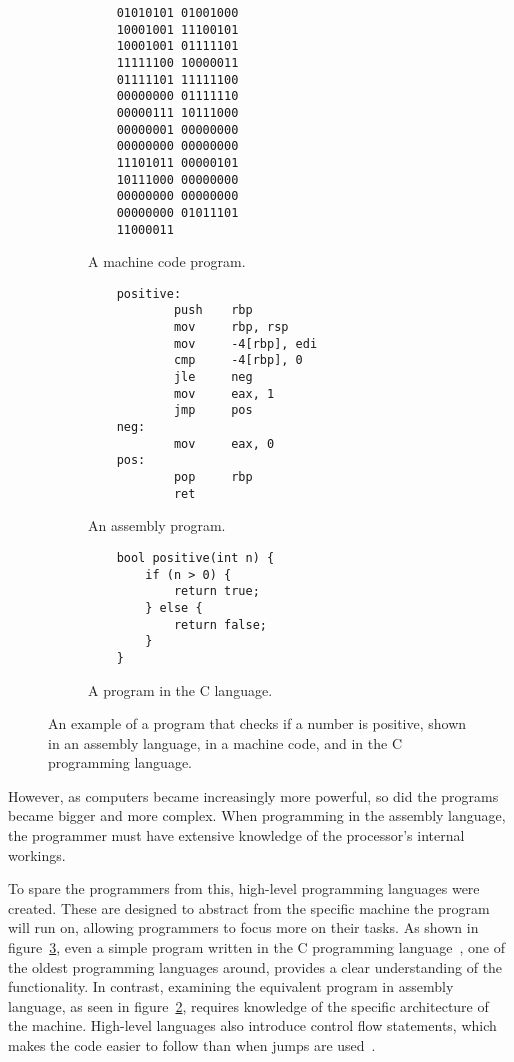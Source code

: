\begin{figure}
    \begin{subfigure}{1.0\textwidth}
        \begin{lstlisting}
    01010101 01001000
    10001001 11100101
    10001001 01111101
    11111100 10000011
    01111101 11111100
    00000000 01111110
    00000111 10111000
    00000001 00000000
    00000000 00000000
    11101011 00000101
    10111000 00000000
    00000000 00000000
    00000000 01011101
    11000011
        \end{lstlisting}
        \caption{A machine code program.}
        \label{subfig:machine-code}
    \end{subfigure}
    \begin{subfigure}{1.0\textwidth}
        \begin{lstlisting}
    positive:
            push    rbp
            mov     rbp, rsp
            mov     -4[rbp], edi
            cmp     -4[rbp], 0
            jle     neg
            mov     eax, 1
            jmp     pos
    neg:
            mov     eax, 0
    pos:
            pop     rbp
            ret
        \end{lstlisting}
        \caption{An assembly program.}
        \label{subfig:assembly}
    \end{subfigure}\vspace{0.5cm}
    \begin{subfigure}{1.0\textwidth}
        \begin{verbatim}
    bool positive(int n) {
        if (n > 0) {
            return true;
        } else {
            return false;
        }
    }
        \end{verbatim}
        \caption{A program in the C language.}
        \label{subfig:c}
    \end{subfigure}
    \vspace{0.5cm}
    \caption{An example of a program that checks if a number is positive, shown
    in an assembly language, in a machine code, and in the C programming
    language.}
    \label{fig:simple-assembly}
\end{figure}

However, as computers became increasingly more powerful, so did the programs
became bigger and more complex. When programming in the assembly language, the
programmer must have extensive knowledge of the processor's internal workings.

To spare the programmers from this, high-level programming languages were
created. These are designed to abstract from the specific machine the program
will run on, allowing programmers to focus more on their tasks. As shown in
figure~\ref{subfig:c}, even a simple program written in the C programming
language~\cite{krc}, one of the oldest programming languages around, provides a
clear understanding of the functionality. In contrast, examining the equivalent
program in assembly language, as seen in figure~\ref{subfig:assembly}, requires
knowledge of the specific architecture of the machine. High-level languages
also introduce control flow statements, which makes the code easier to follow
than when jumps are used~\cite{gotobad}.

